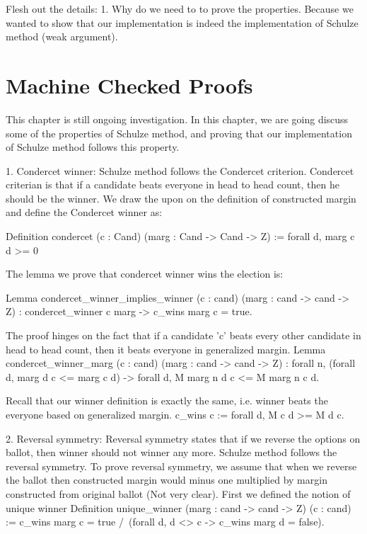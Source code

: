   
  
 
  
  Flesh out the details:
  1. Why do we need to to prove the properties. 
      Because we wanted to show that our implementation is indeed the implementation of 
      Schulze method (weak argument). 
      
  
  \section{Machine Checked Proofs}
    This chapter is still ongoing investigation.
	In this chapter, we are going discuss some of the properties of Schulze method, and proving that our implementation of Schulze method
	follows this property. 
	
	1. Condercet winner: 
	Schulze method follows the Condercet criterion. Condercet criterian is that if a candidate beats everyone in head to head count, then he should 
	be the winner. We draw the upon on the definition of constructed margin and define the Condercet winner as:
	
	Definition condercet (c : Cand) (marg : Cand -> Cand -> Z) := forall d, marg c d >= 0
	
	The lemma we prove that condercet winner wins the election is:
	
	 Lemma condercet_winner_implies_winner (c : cand) (marg : cand -> cand -> Z) :
      condercet_winner c marg -> c_wins marg c = true. 
	  
   The proof hinges on the fact that if a candidate 'c' beats every other candidate in head to head count, then it beats
       everyone in generalized margin. 
       Lemma condercet_winner_marg (c : cand) (marg : cand -> cand -> Z) :
      forall n, (forall d, marg d c <= marg c d) -> forall d, M marg n d c <= M marg n c d.
    
    Recall that our winner definition is exactly the same, i.e. winner beats the everyone based on generalized margin. 
    c_wins c := forall d, M c d >= M d c. 
    
    2. Reversal symmetry:
      Reversal symmetry states that if we reverse the options on ballot, then winner should not winner any more. 
      Schulze method follows the reversal symmetry. 
      To prove reversal symmetry, we assume that when we reverse the ballot then constructed margin would 
      minus one multiplied by margin constructed from original ballot (Not very clear). 
      First we defined the notion of unique winner 
      Definition unique_winner (marg : cand -> cand -> Z) (c : cand) :=
      c_wins marg c = true /\ (forall d, d <> c -> c_wins marg d = false).
      
